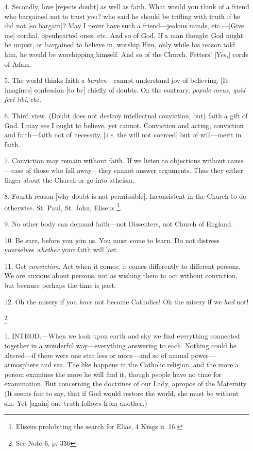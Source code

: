 4. Secondly, love [rejects doubt] as well as
faith. What would you think of a friend who bargained not to trust
you? who said he should be trifling with truth if he did not [so
bargain]? May I never have such a friend—jealous minds, etc.—[Give
me] cordial, openhearted ones, etc. And so of God. If a man thought
God might be unjust, or bargained to believe in, worship Him, only
while his reason told him, he would be worshipping himself. And so of
the Church. Fetters! [Yes,] cords of Adam.

5. The world thinks faith a \emph{burden}—cannot
understand joy of believing. [It imagines] confession [to be] chiefly
of doubts. On the contrary, \emph{popule meus, quid feci tibi}, etc.

6. Third view. (Doubt does not destroy
intellectual conviction, but) faith a gift of God. I may see I ought
to believe, yet cannot. Conviction and acting, conviction and
faith—faith not of necessity, [\emph{i.e}. the will not
coerced] but of will—merit in faith.

7. Conviction may remain without faith. If we
listen to objections without cause—case of those who fall
away—they cannot answer arguments. Thus they either linger about the
Church or go into atheism.

8. Fourth reason [why doubt is not permissible].
Inconsistent in the Church to do otherwise. St. Paul, St. John,
Eliseus \footnote{Eliseus prohibiting the
search for Elias, 4 Kings ii. 16.}.

9. No other body can demand faith—not
Dissenters, not Church of England.

10. Be sure, before you join us. You must come to
learn. Do not distress yourselves \emph{whether} your faith will last.

11. Get \emph{conviction}. Act when it comes; it
comes differently to different persons. We are anxious about persons,
not as wishing them to act without conviction, but because perhaps the
time is past.

12. Oh the misery if you \emph{have} not become
Catholics! Oh the misery if we \emph{had} not!


\footnote{See Note
6, p. 336}

1. INTROD.—When
we look upon earth and sky we find everything connected together in a
wonderful way—everything answering to each. Nothing could be
altered—if there were one star less or more—and so of animal
power—atmosphere and sea. The like happens in the Catholic
religion, and the more a person examines the more he will find it,
though people have no time for examination. But concerning the
doctrines of our Lady, apropos of the Maternity. (It seems fair to
say, that if God would restore the world, she must be without sin. Yet
[again] one truth follows from another.)


